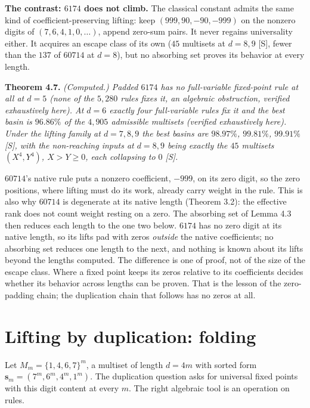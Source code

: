 \documentclass[11pt,letterpaper]{article}
\theoremstyle{paperstyle}
\theoremstyle{paperstyledef}
\theoremstyle{paperstylerem}
\begin{document}
\textbf{The contrast: \(6174\) does not climb.} The classical constant admits the same kind of coefficient-preserving lifting: keep \((999, 90, -90, -999)\) on the nonzero digits of \((7,6,4,1,0,\dots)\), append zero-sum pairs. It never regains universality either. It acquires an escape class of its own (\(45\) multisets at \(d = 8, 9\) {[}S{]}, fewer than the \(137\) of \(60714\) at \(d = 8\)), but no absorbing set proves its behavior at every length.

\textbf{Theorem 4.7.} \emph{(Computed.) Padded \(6174\) has no full-variable fixed-point rule at all at \(d = 5\) (none of the \(5{,}280\) rules fixes it, an algebraic obstruction, verified exhaustively here). At \(d = 6\) exactly four full-variable rules fix it and the best basin is \(96.86\%\) of the \(4{,}905\) admissible multisets (verified exhaustively here). Under the lifting family at \(d = 7, 8, 9\) the best basins are \(98.97\%\), \(99.81\%\), \(99.91\%\) {[}S{]}, with the non-reaching inputs at \(d = 8, 9\) being exactly the \(45\) multisets \((X^4, Y^4)\), \(X > Y \geq 0\), each collapsing to \(0\) {[}S{]}.}

\(60714\)'s native rule puts a nonzero coefficient, \(-999\), on its zero digit, so the zero positions, where lifting must do its work, already carry weight in the rule. This is also why \(60714\) is degenerate at its native length (Theorem 3.2): the effective rank does not count weight resting on a zero. The absorbing set of Lemma 4.3 then reduces each length to the one two below. \(6174\) has no zero digit at its native length, so its lifts pad with zeros \emph{outside} the native coefficients; no absorbing set reduces one length to the next, and nothing is known about its lifts beyond the lengths computed. The difference is one of proof, not of the size of the escape class. Where a fixed point keeps its zeros relative to its coefficients decides whether its behavior across lengths can be proven. That is the lesson of the zero-padding chain; the duplication chain that follows has no zeros at all.

\section{Lifting by duplication: folding}\label{lifting-by-duplication-folding}

Let \(M_m = \{1,4,6,7\}^m\), a multiset of length \(d = 4m\) with sorted form \(\mathbf{s}_m = (7^m, 6^m, 4^m, 1^m)\). The duplication question asks for universal fixed points with this digit content at every \(m\). The right algebraic tool is an operation on rules.
\end{document}
